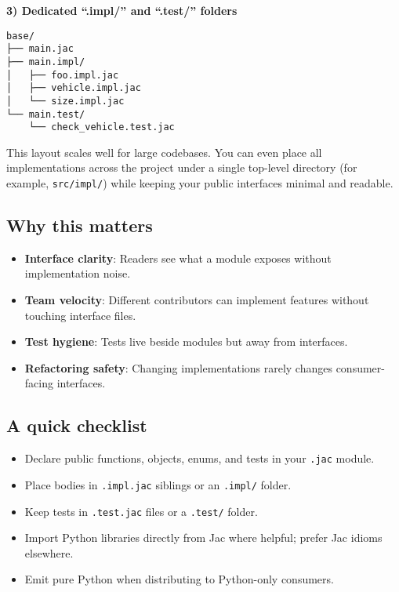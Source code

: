 \textbf{3) Dedicated ``.impl/'' and ``.test/'' folders}

\begin{lstlisting}[language=shell]
base/
├── main.jac
├── main.impl/
│   ├── foo.impl.jac
│   ├── vehicle.impl.jac
│   └── size.impl.jac
└── main.test/
    └── check_vehicle.test.jac
\end{lstlisting}

This layout scales well for large codebases. You can even place all implementations across the project under a single top-level directory (for example, \texttt{src/impl/}) while keeping your public interfaces minimal and readable.

\subsection*{Why this matters}
\begin{itemize}
    \item \textbf{Interface clarity}: Readers see what a module exposes without implementation noise.
    \item \textbf{Team velocity}: Different contributors can implement features without touching interface files.
    \item \textbf{Test hygiene}: Tests live beside modules but away from interfaces.
    \item \textbf{Refactoring safety}: Changing implementations rarely changes consumer-facing interfaces.
\end{itemize}

\subsection*{A quick checklist}
\begin{itemize}
    \item Declare public functions, objects, enums, and tests in your \texttt{.jac} module.
    \item Place bodies in \texttt{.impl.jac} siblings or an \texttt{.impl/} folder.
    \item Keep tests in \texttt{.test.jac} files or a \texttt{.test/} folder.
    \item Import Python libraries directly from Jac where helpful; prefer Jac idioms elsewhere.
    \item Emit pure Python when distributing to Python-only consumers.
\end{itemize}